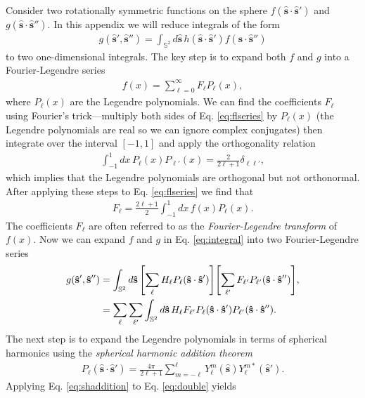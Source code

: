 \documentclass[11pt]{article}
\providecommand{\mh}[1]{\mathbf{\hat{#1}}}
\providecommand{\mbb}[1]{\mathbb{#1}}
\providecommand{\ints}[1]{\int_{\mbb{S}^{#1}}}
\let\originalleft\left
\let\originalright\right
\renewcommand{\left}{\mathopen{}\mathclose\bgroup\originalleft}
\renewcommand{\right}{\aftergroup\egroup\originalright}
\begin{document}
Consider two rotationally symmetric functions on the sphere
$f(\mh{s}\cdot\mh{s}')$ and $g(\mh{s}\cdot\mh{s}'')$. In this appendix we will
reduce integrals of the form
\begin{align}
  g(\mh{s}', \mh{s}'') = \ints{2}d\mh{s}\,h(\mh{s}\cdot\mh{s}')f(\mh{s}\cdot\mh{s}'')\label{eq:integral}
\end{align}
to two one-dimensional integrals. The key step is to expand both $f$ and $g$
into a Fourier-Legendre series
\begin{align}
  f(x) = \sum_{\ell=0}^{\infty}F_{\ell}P_{\ell}(x), \label{eq:flseries}
\end{align}
where $P_{\ell}(x)$ are the Legendre polynomials. We can find
the coefficients $F_{\ell}$ using Fourier's trick---multiply both sides of Eq.
\eqref{eq:flseries} by $P_{\ell}(x)$ (the Legendre polynomials
are real so we can ignore complex conjugates) then integrate over the interval
$[-1,1]$ and apply the orthogonality relation
\begin{align}
  \int_{-1}^1dx\,P_\ell(x)P_{\ell'}(x) = \frac{2}{2\ell+1}\delta_{\ell\ell'},
\end{align}
which implies that the Legendre polynomials are orthogonal but not orthonormal.
After applying these steps to Eq. \eqref{eq:flseries} we find that
\begin{align}
  F_{\ell} = \frac{2\ell+1}{2}\int_{-1}^1dx\,f(x)P_{\ell}(x).
\end{align}
The coefficients $F_{\ell}$ are often referred to as the
\textit{Fourier-Legendre transform} of $f(x)$. Now we can expand $f$ and $g$ in
Eq. \eqref{eq:integral} into two Fourier-Legendre series
\begin{align}
  g(\mh{s}', \mh{s}'') &= \ints{2}d\mh{s}\,\left[\sum_{\ell} H_\ell P_\ell (\mh{s}\cdot\mh{s}')\right]\left[\sum_{\ell'}F_{\ell'}P_{\ell'}(\mh{s}\cdot\mh{s}'')\right],\\
  &=\sum_{\ell}\sum_{\ell'} \ints{2}d\mh{s}\,H_\ell F_{\ell'} P_\ell (\mh{s}\cdot\mh{s}')P_{\ell'}(\mh{s}\cdot\mh{s}'').\label{eq:double}
\end{align}
The next step is to expand the Legendre polynomials in terms of spherical harmonics using the \textit{spherical harmonic addition theorem}
\begin{align}
  P_\ell(\mh{s}\cdot\mh{s}') = \frac{4\pi}{2\ell + 1}\sum_{m=-\ell}^{\ell}Y_\ell^m(\mh{s})Y_\ell^{m*}(\mh{s}'). \label{eq:shaddition}
\end{align}
Applying Eq. \eqref{eq:shaddition} to Eq. \eqref{eq:double} yields
\end{document}
